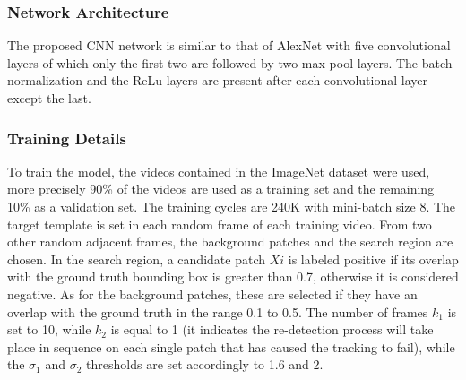 \subsubsection{Network Architecture}
The proposed CNN network is similar to that of AlexNet \cite{0893551108} with five convolutional 
layers of which only the first two are followed by two max pool 
layers. The batch normalization \cite{0893551138} and the ReLu layers are present after 
each convolutional layer except the last.

\subsubsection{Training Details}
To train the model, the videos contained in the ImageNet dataset were used, 
more precisely 90\% of the videos are used as a training set and the remaining 
10\% as a validation set. The training cycles are 240K with mini-batch size 8. 
The target template is set in each random frame of each training video. From 
two other random adjacent frames, the background patches and the search 
region are chosen. In the search region, a candidate patch $Xi$ is labeled 
positive if its overlap with the ground truth bounding box is greater than 
0.7, otherwise it is considered negative. As for the background patches, these 
are selected if they have an overlap with the ground truth in the range 0.1 to 
0.5. The number of frames $k_1$ is set to 10, while $k_2$ is equal to 1 (it 
indicates the re-detection process will take place in sequence on each single 
patch that has caused the tracking to fail), while the $\sigma_1$ and $\sigma_2$ thresholds 
are set accordingly to 1.6 and 2.